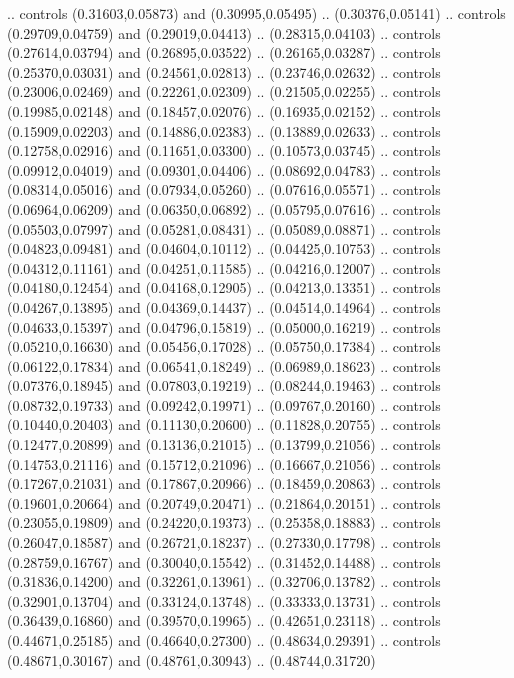     .. controls (0.31603,0.05873) and (0.30995,0.05495) .. (0.30376,0.05141)
    .. controls (0.29709,0.04759) and (0.29019,0.04413) .. (0.28315,0.04103)
    .. controls (0.27614,0.03794) and (0.26895,0.03522) .. (0.26165,0.03287)
    .. controls (0.25370,0.03031) and (0.24561,0.02813) .. (0.23746,0.02632)
    .. controls (0.23006,0.02469) and (0.22261,0.02309) .. (0.21505,0.02255)
    .. controls (0.19985,0.02148) and (0.18457,0.02076) .. (0.16935,0.02152)
    .. controls (0.15909,0.02203) and (0.14886,0.02383) .. (0.13889,0.02633)
    .. controls (0.12758,0.02916) and (0.11651,0.03300) .. (0.10573,0.03745)
    .. controls (0.09912,0.04019) and (0.09301,0.04406) .. (0.08692,0.04783)
    .. controls (0.08314,0.05016) and (0.07934,0.05260) .. (0.07616,0.05571)
    .. controls (0.06964,0.06209) and (0.06350,0.06892) .. (0.05795,0.07616)
    .. controls (0.05503,0.07997) and (0.05281,0.08431) .. (0.05089,0.08871)
    .. controls (0.04823,0.09481) and (0.04604,0.10112) .. (0.04425,0.10753)
    .. controls (0.04312,0.11161) and (0.04251,0.11585) .. (0.04216,0.12007)
    .. controls (0.04180,0.12454) and (0.04168,0.12905) .. (0.04213,0.13351)
    .. controls (0.04267,0.13895) and (0.04369,0.14437) .. (0.04514,0.14964)
    .. controls (0.04633,0.15397) and (0.04796,0.15819) .. (0.05000,0.16219)
    .. controls (0.05210,0.16630) and (0.05456,0.17028) .. (0.05750,0.17384)
    .. controls (0.06122,0.17834) and (0.06541,0.18249) .. (0.06989,0.18623)
    .. controls (0.07376,0.18945) and (0.07803,0.19219) .. (0.08244,0.19463)
    .. controls (0.08732,0.19733) and (0.09242,0.19971) .. (0.09767,0.20160)
    .. controls (0.10440,0.20403) and (0.11130,0.20600) .. (0.11828,0.20755)
    .. controls (0.12477,0.20899) and (0.13136,0.21015) .. (0.13799,0.21056)
    .. controls (0.14753,0.21116) and (0.15712,0.21096) .. (0.16667,0.21056)
    .. controls (0.17267,0.21031) and (0.17867,0.20966) .. (0.18459,0.20863)
    .. controls (0.19601,0.20664) and (0.20749,0.20471) .. (0.21864,0.20151)
    .. controls (0.23055,0.19809) and (0.24220,0.19373) .. (0.25358,0.18883)
    .. controls (0.26047,0.18587) and (0.26721,0.18237) .. (0.27330,0.17798)
    .. controls (0.28759,0.16767) and (0.30040,0.15542) .. (0.31452,0.14488)
    .. controls (0.31836,0.14200) and (0.32261,0.13961) .. (0.32706,0.13782)
    .. controls (0.32901,0.13704) and (0.33124,0.13748) .. (0.33333,0.13731)
    .. controls (0.36439,0.16860) and (0.39570,0.19965) .. (0.42651,0.23118)
    .. controls (0.44671,0.25185) and (0.46640,0.27300) .. (0.48634,0.29391)
    .. controls (0.48671,0.30167) and (0.48761,0.30943) .. (0.48744,0.31720)

